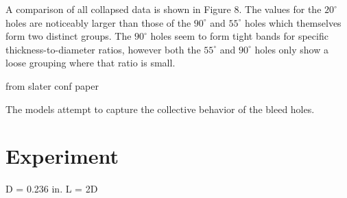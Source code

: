 A comparison of all collapsed data is shown in Figure 8. The values for the $20^\circ$ holes are noticeably larger than those of the $90^\circ$ and $55^\circ$ holes which themselves form two distinct groups. The $90^\circ$ holes seem to form tight bands for specific thickness-to-diameter ratios, however both the $55^\circ$ and $90^\circ$ holes only show a loose grouping where that ratio is small.


from slater conf paper


The models attempt to capture the collective behavior of the bleed holes.



\section{Experiment}


D = 0.236 in.
L = 2D

